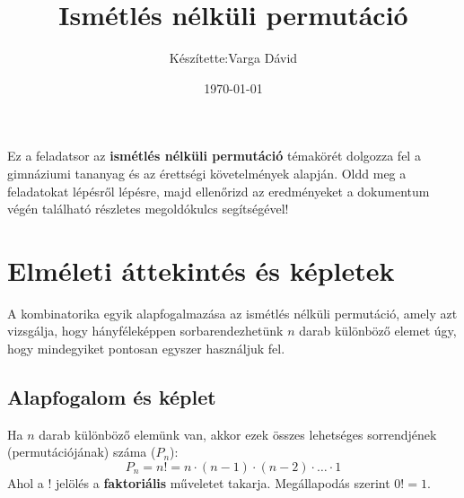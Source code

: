 \documentclass[12pt,a4paper]{article}
\title{Ismétlés nélküli permutáció}
\author{Készítette:Varga Dávid}
\date{\today}
\begin{document}
\maketitle

\begin{center}
    \begin{tcolorbox}[colback=blue!5!white,colframe=blue!75!black,width=0.9\textwidth,arc=4mm,title=\textbf{Üdvözlet a gyakorlóhoz!}]
    Ez a feladatsor az \textbf{ismétlés nélküli permutáció} témakörét dolgozza fel a gimnáziumi tananyag és az érettségi követelmények alapján. Oldd meg a feladatokat lépésről lépésre, majd ellenőrizd az eredményeket a dokumentum végén található részletes megoldókulcs segítségével!
    \end{tcolorbox}
\end{center}

\vspace{0.5cm}

\section{Elméleti áttekintés és képletek}

A kombinatorika egyik alapfogalmazása az ismétlés nélküli permutáció, amely azt vizsgálja, hogy hányféleképpen sorbarendezhetünk $n$ darab különböző elemet úgy, hogy mindegyiket pontosan egyszer használjuk fel.

\subsection{Alapfogalom és képlet}
Ha $n$ darab különböző elemünk van, akkor ezek összes lehetséges sorrendjének (permutációjának) száma ($P_n$):
\begin{equation}
    P_n = n! = n \cdot (n - 1) \cdot (n - 2) \cdot \ldots \cdot 1
\end{equation}
Ahol a $!$ jelölés a \textbf{faktoriális} műveletet takarja. Megállapodás szerint $0! = 1$.
\end{document}
